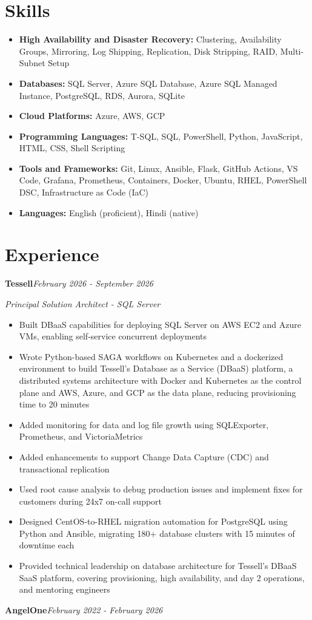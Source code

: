 \documentclass[10pt,a4paper]{article}
\begin{document}
\section{Skills}
\begin{itemize}
  \item \textbf{High Availability and Disaster Recovery:} Clustering, Availability Groups, Mirroring, Log Shipping, Replication, Disk Stripping, RAID, Multi-Subnet Setup
  \item \textbf{Databases:} SQL Server, Azure SQL Database, Azure SQL Managed Instance, PostgreSQL, RDS, Aurora, SQLite
  \item \textbf{Cloud Platforms:} Azure, AWS, GCP
  \item \textbf{Programming Languages:} T-SQL, SQL, PowerShell, Python, JavaScript, HTML, CSS, Shell Scripting
  \item \textbf{Tools and Frameworks:} Git, Linux, Ansible, Flask, GitHub Actions, VS Code, Grafana, Prometheus, Containers, Docker, Ubuntu, RHEL, PowerShell DSC, Infrastructure as Code (IaC)
  \item \textbf{Languages:} English (proficient), Hindi (native)
\end{itemize}

\section{Experience}

\noindent\textbf{Tessell}\hfill \textit{February 2026 - September 2026}

\textit{Principal Solution Architect - SQL Server}\\[-5pt]
\begin{itemize}
  \item Built DBaaS capabilities for deploying SQL Server on AWS EC2 and Azure VMs, enabling self-service concurrent deployments
  \item Wrote Python-based SAGA workflows on Kubernetes and a dockerized environment to build Tessell's Database as a Service (DBaaS) platform, a distributed systems architecture with Docker and Kubernetes as the control plane and AWS, Azure, and GCP as the data plane, reducing provisioning time to 20 minutes
  \item Added monitoring for data and log file growth using SQLExporter, Prometheus, and VictoriaMetrics
  \item Added enhancements to support Change Data Capture (CDC) and transactional replication
  \item Used root cause analysis to debug production issues and implement fixes for customers during 24x7 on-call support
  \item Designed CentOS-to-RHEL migration automation for PostgreSQL using Python and Ansible, migrating 180+ database clusters with 15 minutes of downtime each
  \item Provided technical leadership on database architecture for Tessell's DBaaS SaaS platform, covering provisioning, high availability, and day 2 operations, and mentoring engineers
\end{itemize}
\vspace{14.7pt}
\noindent\textbf{AngelOne}\hfill \textit{February 2022 - February 2026}
\end{document}
